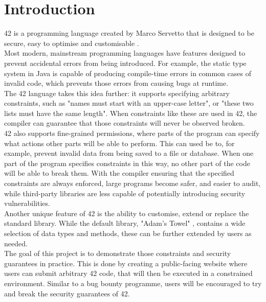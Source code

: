 \newcommand{\code}[1]{\texttt{\textbf{#1}}}
\newcommand{\img}[2]{
\begin{figure}[H]
\texttt{[image: \#1]}
\caption{#2}
\end{figure}}


\chapter{Introduction}\label{C:intro}

42 is a programming language created by Marco Servetto that is designed to be secure, easy to optimise and customisable \cite{servetto-2022A}.
\\[12pt]
Most modern, mainstream programming languages have features designed to prevent accidental errors from being introduced. For example, the static type system in Java is capable of producing compile-time errors in common cases of invalid code, which prevents those errors from causing bugs at runtime. 
\\[12pt]
The 42 language takes this idea further: it supports specifying arbitrary constraints, such as "names must start with an upper-case letter", or "these two lists must have the same length". When constraints like these are used in 42, the compiler can guarantee that those constraints will never be observed broken.
\\[12pt]
42 also supports fine-grained permissions, where parts of the program can specify what actions other parts will be able to perform. This can used be to, for example, prevent invalid data from being saved to a file or database. When one part of the program specifies constraints in this way, no other part of the code will be able to break them. With the compiler ensuring that the specified constraints are always enforced, large programs become safer, and easier to audit, while third-party libraries are less capable of potentially introducing security vulnerabilities.
\\[12pt]
Another unique feature of 42 is the ability to customise, extend or replace the standard library. While the default library, "Adam's Towel" \cite{servetto-2022B}, contains a wide selection of data types and methods, these can be further extended by users as needed.
\\[12pt]
The goal of this project is to demonstrate those constraints and security guarantees in practice. This is done by creating a public-facing website where users can submit arbitrary 42 code, that will then be executed in a constrained environment. Similar to a bug bounty programme, users will be encouraged to try and break the security guarantees of 42.




